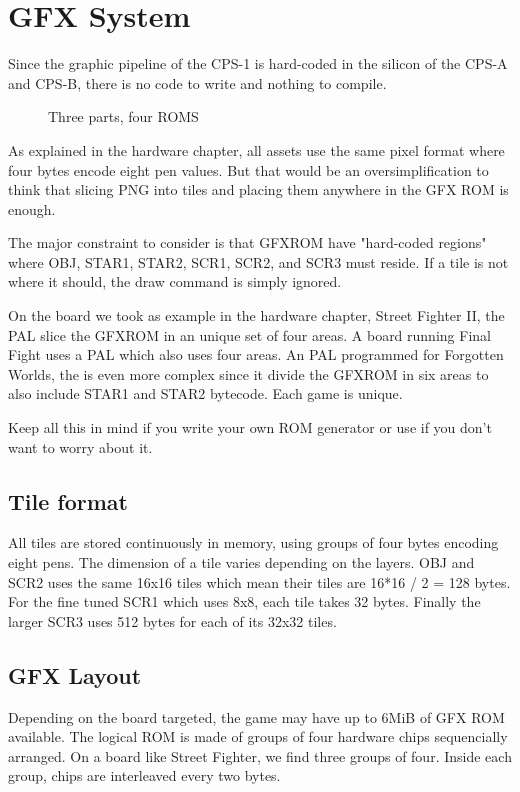 \chapter{GFX System}
Since the graphic pipeline of the CPS-1 is hard-coded in the silicon of the CPS-A and CPS-B, there is no code to write and nothing to compile. 

\begin{figure}[H]
\caption*{Three parts, four ROMS}
\end{figure}

As explained in the hardware chapter, all assets use the same pixel format where four bytes encode eight pen values. But that would be an oversimplification to think that slicing PNG into tiles and placing them anywhere in the GFX ROM is enough.

The major constraint to consider is that GFXROM have "hard-coded regions" where OBJ, STAR1, STAR2, SCR1, SCR2, and SCR3 must reside. If a tile is not where it should, the draw command is simply ignored.

On the board we took as example in the hardware chapter, Street Fighter II, the  PAL slice the GFXROM in an unique set of four areas. A board running Final Fight uses a  PAL which also uses four areas. An PAL programmed for Forgotten Worlds, the  is even more complex since it divide the GFXROM in six areas to also include STAR1 and STAR2 bytecode. Each game is unique. 

Keep all this in mind if you write your own ROM generator or use  if you don't want to worry about it.

\section{Tile format}
All tiles are stored continuously in memory, using groups of four bytes encoding eight pens. The dimension of a tile varies depending on the layers. OBJ and SCR2 uses the same 16x16 tiles which mean their tiles are 16*16 / 2 = 128 bytes. For the fine tuned SCR1 which uses 8x8, each tile takes 32 bytes. Finally the larger SCR3 uses 512 bytes for each of its 32x32 tiles.

\section{GFX Layout}
Depending on the board targeted, the game may have up to 6MiB of GFX ROM available. The logical ROM is made of groups of four hardware chips sequencially arranged. On a board like Street Fighter, we find three groups of four. Inside each group, chips are interleaved every two bytes.

